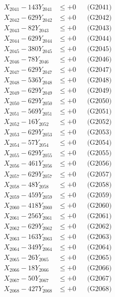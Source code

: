 \documentclass[a4paper,10pt]{article}
\begin{document}
{\begin{align}
\allowbreak
X_{2041} - 143Y_{2041} &\leq +0 && \text{(G2041)} \\
X_{2042} - 629Y_{2042} &\leq +0 && \text{(G2042)} \\
X_{2043} - 82Y_{2043} &\leq +0 && \text{(G2043)} \\
X_{2044} - 629Y_{2044} &\leq +0 && \text{(G2044)} \\
X_{2045} - 380Y_{2045} &\leq +0 && \text{(G2045)} \\
X_{2046} - 78Y_{2046} &\leq +0 && \text{(G2046)} \\
X_{2047} - 629Y_{2047} &\leq +0 && \text{(G2047)} \\
X_{2048} - 536Y_{2048} &\leq +0 && \text{(G2048)} \\
X_{2049} - 629Y_{2049} &\leq +0 && \text{(G2049)} \\
X_{2050} - 629Y_{2050} &\leq +0 && \text{(G2050)} \\
\allowbreak
X_{2051} - 569Y_{2051} &\leq +0 && \text{(G2051)} \\
X_{2052} - 16Y_{2052} &\leq +0 && \text{(G2052)} \\
X_{2053} - 629Y_{2053} &\leq +0 && \text{(G2053)} \\
X_{2054} - 57Y_{2054} &\leq +0 && \text{(G2054)} \\
X_{2055} - 629Y_{2055} &\leq +0 && \text{(G2055)} \\
X_{2056} - 461Y_{2056} &\leq +0 && \text{(G2056)} \\
X_{2057} - 629Y_{2057} &\leq +0 && \text{(G2057)} \\
X_{2058} - 48Y_{2058} &\leq +0 && \text{(G2058)} \\
X_{2059} - 459Y_{2059} &\leq +0 && \text{(G2059)} \\
X_{2060} - 418Y_{2060} &\leq +0 && \text{(G2060)} \\
\allowbreak
X_{2061} - 256Y_{2061} &\leq +0 && \text{(G2061)} \\
X_{2062} - 629Y_{2062} &\leq +0 && \text{(G2062)} \\
X_{2063} - 163Y_{2063} &\leq +0 && \text{(G2063)} \\
X_{2064} - 349Y_{2064} &\leq +0 && \text{(G2064)} \\
X_{2065} - 26Y_{2065} &\leq +0 && \text{(G2065)} \\
X_{2066} - 18Y_{2066} &\leq +0 && \text{(G2066)} \\
X_{2067} - 50Y_{2067} &\leq +0 && \text{(G2067)} \\
X_{2068} - 427Y_{2068} &\leq +0 && \text{(G2068)} \\

\end{align}}
\end{document}
